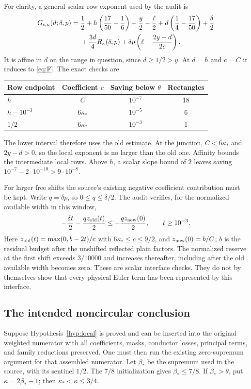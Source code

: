 \documentclass[11pt]{article}
\theoremstyle{definition}
\begin{document}
For clarity, a general scalar row exponent used by the audit is
\begin{align}\label{eq:G}
 G_{c,\kappa}(d;\delta,p)={}&\frac12
 +h\left(\frac{17}{50}-\frac16\right)-\frac y2-\frac\ell2
 +d\left(\frac14-\frac{17}{50}\right)+\frac\delta2\notag\\
 &+\frac{3d}{4}R_\kappa(\delta,p)
 +\delta p\left(\ell-\frac{2y-d}{2c}\right).
\end{align}
It is affine in $d$ on the range in question, since $d\ge1/2>y$.
At $d=h$ and $c=C$ it reduces to \eqref{eq:F}. The exact checks are
\begin{center}
\begin{tabular}{lccc}
\toprule
Row endpoint & Coefficient $c$ & Saving below $\theta$ & Rectangles\\
\midrule
$h$ & $C$ & $10^{-7}$ & 18\\
$h-10^{-3}$ & $6\kappa_*$ & $10^{-5}$ & 6\\
$1/2$ & $6\kappa_*$ & $10^{-3}$ & 1\\
\bottomrule
\end{tabular}
\end{center}
The lower interval therefore uses the old estimate. At the junction,
$C<6\kappa_*$ and $2y-d>0$, so the local exponent is no larger
than the old one. Affinity bounds the intermediate local rows. Above
$h$, a scalar slope bound of $2$ leaves saving
$10^{-7}-2\cdot10^{-10}>9\cdot10^{-8}$.

For larger free shifts the source's existing negative coefficient
contribution must be kept. Write $q=\delta p$, so $0\le q\le\delta/2$.
The audit verifies, for the normalized available width in this window,
\[
 -\frac{\delta t}{2}-\frac{qz_{\rm old}(t)}2
 \le-\frac{qz_{\rm new}(0)}2,\qquad t\ge10^{-3}.
\]
Here $z_{\rm old}(t)=\max(0,b-2t)/c$ with
$6\kappa_*\le c\le9/2$, and $z_{\rm new}(0)=b/C$; $b$ is the
residual budget after the unshifted reflected plain factors. The
normalized reserve at the first shift exceeds $3/10000$ and increases
thereafter, including after the old available width becomes zero.
These are scalar interface checks. They do not by themselves show that
every physical Euler term has been represented by this interface.

\subsection{The intended noncircular conclusion}
Suppose Hypothesis~\ref{hyp:local} is proved and can be inserted into
the original weighted numerator with all coefficients, masks, conductor
losses, principal terms, and family reductions preserved. One must then
run the existing zero-supremum argument for that assembled numerator.
Let $\beta_*$ be the supremum used in the source, with its sentinel
$1/2$. The $7/8$ initialization gives $\beta_*\le7/8$. If
$\beta_*>\theta$, put $\kappa=2\beta_*-1$; then
$\kappa_*<\kappa\le3/4$.
\end{document}
